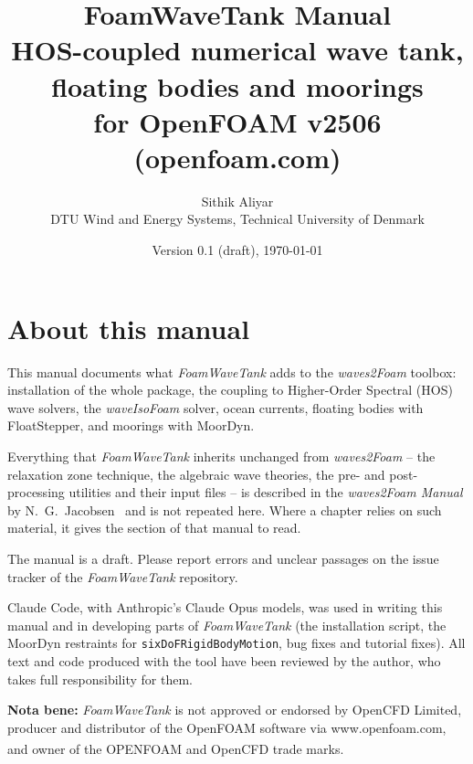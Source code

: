 \documentclass[11pt,a4paper,oneside]{report}
\title{\Huge FoamWaveTank Manual\\[0.5em]
  \Large HOS-coupled numerical wave tank, floating bodies and moorings\\
  for OpenFOAM v2506 (openfoam.com)}
\author{Sithik Aliyar\\DTU Wind and Energy Systems, Technical University of Denmark}
\date{Version 0.1 (draft), \today}
\newcommand{\NB}[1]{\begin{notebox}\textbf{Nota bene:} #1\end{notebox}}
\newcommand{\kw}[1]{\texttt{#1}}
\newcommand{\app}[1]{\textit{#1}}
\newcommand{\wtwof}{\textit{waves2Foam}}
\newcommand{\fwt}{\textit{FoamWaveTank}}
\begin{document}
\maketitle

\chapter*{About this manual}
This manual documents what \fwt{} adds to the \wtwof{} toolbox: installation of the whole
package, the coupling to Higher-Order Spectral (HOS) wave solvers, the \app{waveIsoFoam}
solver, ocean currents, floating bodies with FloatStepper, and moorings with MoorDyn.

Everything that \fwt{} inherits unchanged from \wtwof{} -- the relaxation zone technique,
the algebraic wave theories, the pre- and post-processing utilities and their input files --
is described in the \emph{waves2Foam Manual} by N.~G.~Jacobsen~\cite{jacobsen2017manual}
and is not repeated here. Where a chapter relies on such material, it gives the section of
that manual to read.

The manual is a draft. Please report errors and unclear passages on the issue tracker of
the \fwt{} repository.

Claude Code, with Anthropic's Claude Opus models, was used in writing this manual and in
developing parts of \fwt{} (the installation script, the MoorDyn restraints for
\kw{sixDoFRigidBodyMotion}, bug fixes and tutorial fixes). All text and code produced with the
tool have been reviewed by the author, who takes full responsibility for them.

\NB{\fwt{} is not approved or endorsed by OpenCFD Limited, producer and distributor of the
OpenFOAM software via www.openfoam.com, and owner of the OPENFOAM\textsuperscript{\textregistered}
and OpenCFD\textsuperscript{\textregistered} trade marks.}

\tableofcontents
\lstlistoflistings










\end{document}
